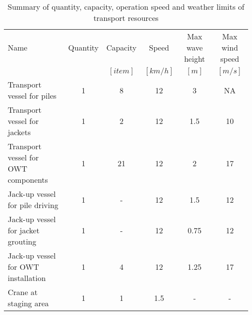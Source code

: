 \begin{table}
\label{tab:ressources}
\begin{tabular}{lccccc}
\hline 
Name & Quantity & Capacity & Speed & Max wave height & Max wind speed \\
& & $[item]$ & $[km/h]$ & $[m]$ & $[m/s]$ \\ 
\hline 
Transport vessel for piles & 1 & 8 & 12 & 3 & NA \\ 
Transport vessel for jackets & 1 & 2 & 12 & 1.5 & 10 \\ 
Transport vessel for OWT components & 1 & 21 & 12 & 2 & 17 \\ 
Jack-up vessel for pile driving & 1 & - & 12 & 1.5 & 12\\
Jack-up vessel for jacket grouting & 1 & - & 12 & 0.75 & 12\\
Jack-up vessel for OWT installation & 1 & 4 & 12 & 1.25 & 17 \\
Crane at staging area & 1 & 1 & 1.5 & - & - \\
\hline 
\end{tabular}

\caption{Summary of quantity, capacity, operation speed and weather limits of transport resources}
\end{table}
